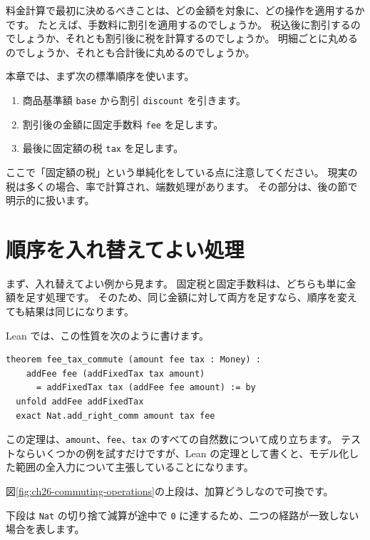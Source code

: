料金計算で最初に決めるべきことは、どの金額を対象に、どの操作を適用するかです。
たとえば、手数料に割引を適用するのでしょうか。
税込後に割引するのでしょうか、それとも割引後に税を計算するのでしょうか。
明細ごとに丸めるのでしょうか、それとも合計後に丸めるのでしょうか。

本章では、まず次の標準順序を使います。

\begin{enumerate}
\item 商品基準額 \texttt{base} から割引 \texttt{discount} を引きます。
\item 割引後の金額に固定手数料 \texttt{fee} を足します。
\item 最後に固定額の税 \texttt{tax} を足します。
\end{enumerate}

ここで「固定額の税」という単純化をしている点に注意してください。
現実の税は多くの場合、率で計算され、端数処理があります。
その部分は、後の節で明示的に扱います。

\section{順序を入れ替えてよい処理}

まず、入れ替えてよい例から見ます。
固定税と固定手数料は、どちらも単に金額を足す処理です。
そのため、同じ金額に対して両方を足すなら、順序を変えても結果は同じになります。

Lean では、この性質を次のように書けます。

\begin{listing}[htbp]
\begin{verbatim}
theorem fee_tax_commute (amount fee tax : Money) :
    addFee fee (addFixedTax tax amount)
      = addFixedTax tax (addFee fee amount) := by
  unfold addFee addFixedTax
  exact Nat.add_right_comm amount tax fee
\end{verbatim}
\caption{\texttt{fee\_tax\_commute}}
\label{lst:ch26-fee-tax-commute}
\end{listing}

この定理は、\texttt{amount}、\texttt{fee}、\texttt{tax} のすべての自然数について成り立ちます。
テストならいくつかの例を試すだけですが、Lean の定理として書くと、モデル化した範囲の全入力について主張していることになります。

図\ref{fig:ch26-commuting-operations}の上段は、加算どうしなので可換です。

下段は \texttt{Nat} の切り捨て減算が途中で \texttt{0} に達するため、二つの経路が一致しない場合を表します。


